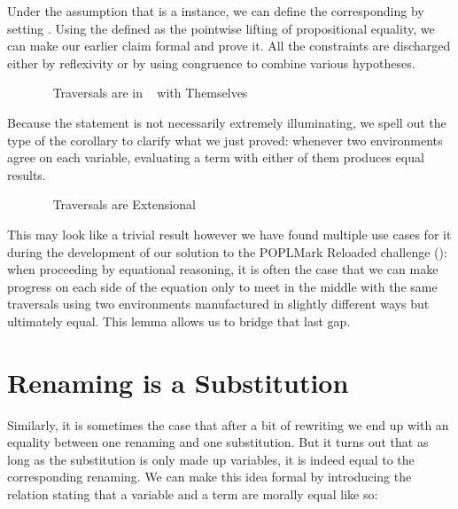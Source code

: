Under the assumption that  is a  instance, we can define the
corresponding   by setting
.
Using  the  defined as the pointwise lifting of propositional equality,
we can make our earlier claim formal and prove it. All the constraints are discharged
either by reflexivity or by using congruence to combine various hypotheses.

\begin{figure}[h]
\caption{~ Traversals are in ~ with Themselves\label{fig:synselfsim}}
\end{figure}

Because the  statement is not necessarily extremely illuminating, we spell
out the type of the corollary to clarify what we just proved: whenever two environments
agree on each variable, evaluating a term with either of them produces equal results.

\begin{figure}[h]
\caption{~ Traversals are Extensional\label{fig:synextensional}}
\end{figure}

This may look like a trivial result however we have found multiple use cases for it
during the development of our solution to the POPLMark Reloaded challenge
(\citeyear{poplmark2}): when proceeding by equational reasoning, it is often the case
that we can make progress on each side of the equation only to meet in the middle with
the same traversals using two environments manufactured in slightly different ways but
ultimately equal. This lemma allows us to bridge that last gap.

\section{Renaming is a Substitution}

Similarly, it is sometimes the case that after a bit of rewriting we end up with an
equality between one renaming and one substitution. But it turns out that as long as
the substitution is only made up variables, it is indeed equal to the corresponding
renaming. We can make this idea formal by introducing the  relation
stating that a variable and a term are morally equal like so:


